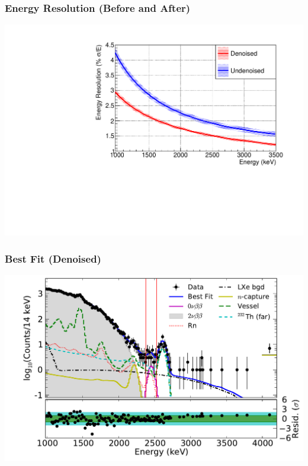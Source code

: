 \documentclass{beamer}
\begin{document}
\begin{frame}
\begin{center}
\frametitle{Energy Resolution (Before and After)}
\end{center}
\vspace{0.5cm}
\begin{center}
\includegraphics[keepaspectratio=true,width=\textwidth,clip=true,trim=0mm 0mm 10mm 10mm]{ResolutionFunctionComparison_relative.pdf}
\end{center}
\end{frame}

\begin{frame}
\begin{center}
\frametitle{Best Fit (Denoised)}
\end{center}
\vspace{0.6cm}
\begin{center}
\includegraphics[keepaspectratio=true,width=\textwidth,clip=true,trim=14mm 0mm 0mm 0mm]{Energy_BestFit_ss.pdf}
\end{center}
\end{frame}
\end{document}
